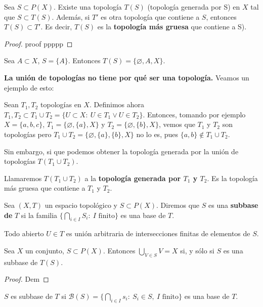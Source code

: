 \begin{nprop}
  Sea $S \subset P(X)$. Existe una topología $T(S)$ (topología generada por S) en $X$ tal que $S \subset T(S)$. Además, si $T'$ es otra topología que contiene a $S$, entonces $T(S) \subset T'$. Es decir, $T(S)$ es la \textbf{topología más gruesa} que contiene a S).
\end{nprop}
\begin{proof}
  proof
  ppppp
\end{proof}
\begin{exmp}
    Sea $A \subset X$, $S = \{A\}$. Entonces $T(S) = \{\varnothing, A, X\}$.
\end{exmp}
\textbf{La unión de topologías no tiene por qué ser una topología.} Veamos un ejemplo de esto:
\begin{exmp}
    Sean $T_1,T_2$ topologías en $X$. Definimos ahora $T_1,T_2 \subset T_1 \cup T_2 = \{U \subset X :\ U \in T_1 \lor U \in T_2\}$. Entonces, tomando por ejemplo $X = \{a,b,c\}$, $T_1 = \{\varnothing, \{a\}, X\}$ y $T_2 = \{\varnothing, \{b\}, X\}$, vemos que $T_1$ y $T_2$ son topologías pero $T_1 \cup T_2 = \{\varnothing, \{a\}, \{b\}, X\}$ no lo es, pues $\{a,b\} \not \in T_1 \cup T_2$.
\end{exmp}
Sin embargo, si que podemos obtener la topología generada por la unión de topologías $T(T_1 \cup T_2)$.
\begin{ndef}
    Llamaremos $T(T_1 \cup T_2)$ a la \textbf{topología generada por $T_1$ y $T_2$}. Es la topología más gruesa que contiene a $T_1$ y $T_2$.
\end{ndef}
\begin{ndef}[Subbase]
    Sea $(X,T)$ un espacio topológico y $S \subset P(X)$. Diremos que $S$ es una \textbf{subbase de} $T$ si la familia $\{\bigcap_{i \in I} S_i :\ I\text{ finito}\}$ es una base de $T$.
\end{ndef}
\begin{obs}
    Todo abierto $U \in T$ es unión arbitraria de intersecciones finitas de elementos de $S$.
\end{obs}
\begin{nprop}
  Sea $X$ un conjunto, $S \subset P(X)$. Entonces $\bigcup_{V \in S} V = X$ si, y sólo si $S$ es una subbase de $T(S)$.
\end{nprop}
\begin{proof}
    Dem
\end{proof}
\begin{nprop}
  $S$ es subbase de $T$ si $\mathcal{B}(S) = \{\bigcap_{i \in I} s_i :\ S_i \in S,\ I \text{ finito}\}$ es una base de $T$.
\end{nprop}
